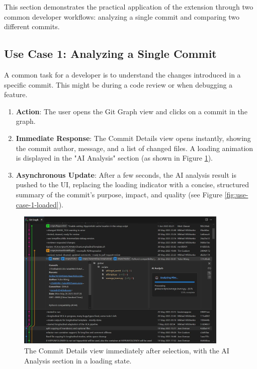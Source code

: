 This section demonstrates the practical application of the extension through two common developer workflows: analyzing a single commit and comparing two different commits.

\subsection{Use Case 1: Analyzing a Single Commit}
A common task for a developer is to understand the changes introduced in a specific commit. This might be during a code review or when debugging a feature.

\begin{enumerate}
    \item \textbf{Action}: The user opens the Git Graph view and clicks on a commit in the graph.
    \item \textbf{Immediate Response}: The Commit Details view opens instantly, showing the commit author, message, and a list of changed files. A loading animation is displayed in the "AI Analysis" section (as shown in Figure \ref{fig:use-case-1-loading}).
    \item \textbf{Asynchronous Update}: After a few seconds, the AI analysis result is pushed to the UI, replacing the loading indicator with a concise, structured summary of the commit's purpose, impact, and quality (see Figure \ref{fig:use-case-1-loaded}).
\end{enumerate}

\begin{figure}[h!]
    \centering
    \includegraphics[width=0.9\textwidth]{figures/use-case-1-loading.jpg}
    \caption{The Commit Details view immediately after selection, with the AI Analysis section in a loading state.}
    \label{fig:use-case-1-loading}
\end{figure}

